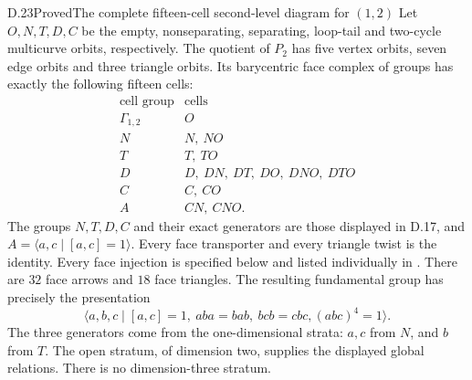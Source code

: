 \begin{result}{D.23}{Proved}{The complete fifteen-cell second-level diagram for $(1,2)$}
Let $O,N,T,D,C$ be the empty, nonseparating, separating,
loop-tail and two-cycle multicurve orbits, respectively.
The quotient of $P_2$ has five vertex orbits, seven edge
orbits and three triangle orbits.  Its barycentric face
complex of groups has exactly the following fifteen cells:
\[
\begin{array}{c|l}
\text{cell group}&\text{cells}\\\hline
\Gamma_{1,2}&O\\
N&N,\ NO\\
T&T,\ TO\\
D&D,\ DN,\ DT,\ DO,\ DNO,\ DTO\\
C&C,\ CO\\
A&CN,\ CNO.
\end{array}
\]
The groups $N,T,D,C$ and their exact generators are those
displayed in D.17, and
$A=\langle a,c\mid[a,c]=1\rangle$.
Every face transporter and every triangle twist is the
identity.  Every face injection is specified below and
listed individually in
.  There are $32$ face
arrows and $18$ face triangles.  The resulting fundamental
group has precisely the presentation
\[
 \langle a,b,c\mid [a,c]=1,\ aba=bab,\ bcb=cbc,
                         (abc)^4=1\rangle.
\]
The three generators come from the one-dimensional strata:
$a,c$ from $N$, and $b$ from $T$.  The open stratum,
of dimension two, supplies the displayed global relations.
There is no dimension-three stratum.
\end{result}
